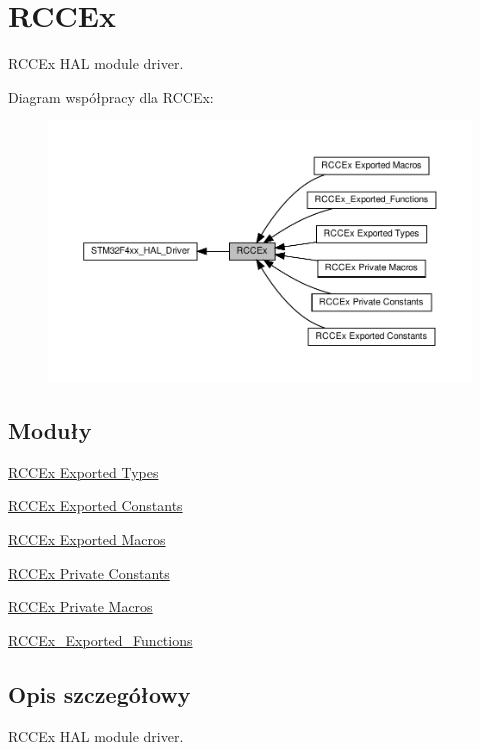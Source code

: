 \hypertarget{group___r_c_c_ex}{}\section{R\+C\+C\+Ex}
\label{group___r_c_c_ex}


R\+C\+C\+Ex H\+AL module driver.  


Diagram współpracy dla R\+C\+C\+Ex\+:\nopagebreak
\begin{figure}[H]
\begin{center}
\leavevmode
\includegraphics[width=350pt]{group___r_c_c_ex}
\end{center}
\end{figure}
\subsection*{Moduły}
\begin{DoxyCompactItemize}
\item 
\hyperlink{group___r_c_c_ex___exported___types}{R\+C\+C\+Ex Exported Types}
\item 
\hyperlink{group___r_c_c_ex___exported___constants}{R\+C\+C\+Ex Exported Constants}
\item 
\hyperlink{group___r_c_c_ex___exported___macros}{R\+C\+C\+Ex Exported Macros}
\item 
\hyperlink{group___r_c_c_ex___private___constants}{R\+C\+C\+Ex Private Constants}
\item 
\hyperlink{group___r_c_c_ex___private___macros}{R\+C\+C\+Ex Private Macros}
\item 
\hyperlink{group___r_c_c_ex___exported___functions}{R\+C\+C\+Ex\+\_\+\+Exported\+\_\+\+Functions}
\end{DoxyCompactItemize}


\subsection{Opis szczegółowy}
R\+C\+C\+Ex H\+AL module driver. 

